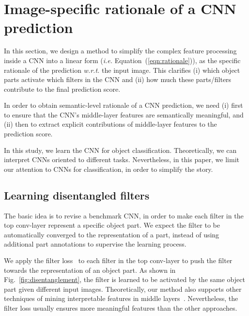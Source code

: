 \documentclass[10pt,twocolumn,letterpaper]{article}
\begin{document}
\section{Image-specific rationale of a CNN prediction}

In this section, we design a method to simplify the complex feature processing inside a CNN into a linear form (\emph{i.e.} Equation~(\ref{eqn:rationale})), as the specific rationale of the prediction \emph{w.r.t.} the input image. This clarifies (i) which object parts activate which filters in the CNN and (ii) how much these parts/filters contribute to the final prediction score.

In order to obtain semantic-level rationale of a CNN prediction, we need (i) first to ensure that the CNN's middle-layer features are semantically meaningful, and (ii) then to extract explicit contributions of middle-layer features to the prediction score.

In this study, we learn the CNN for object classification. Theoretically, we can interpret CNNs oriented to different tasks. Nevertheless, in this paper, we limit our attention to CNNs for classification, in order to simplify the story.

\subsection{Learning disentangled filters}

The basic idea is to revise a benchmark CNN, in order to make each filter in the top conv-layer represent a specific object part. We expect the filter to be automatically converged to the representation of a part, instead of using additional part annotations to supervise the learning process.

We apply the filter loss~\cite{interpretableCNN} to each filter in the top conv-layer to push the filter towards the representation of an object part. As shown in Fig.~\ref{fig:disentanglement}, the filter is learned to be activated by the same object part given different input images. Theoretically, our method also supports other techniques of mining interpretable features in middle layers~\cite{explanatoryGraph,ObjectDiscoveryCNN_2}. Nevertheless, the filter loss usually ensures more meaningful features than the other approaches.
\end{document}
